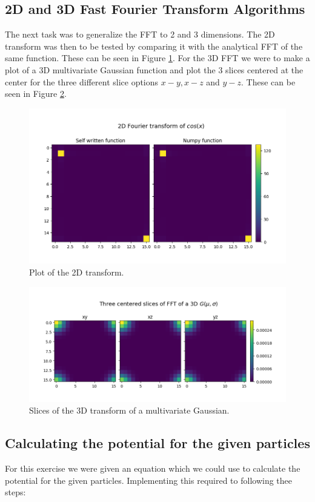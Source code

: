\documentclass[a4paper,10pt]{article}
\begin{document}
\subsection{2D and 3D Fast Fourier Transform Algorithms}

The next task was to generalize the FFT to 2 and 3 dimensions. The 2D transform was then to be tested by comparing it with the analytical FFT of the same function. These can be seen in Figure \ref{fig:5f}. For the 3D FFT we were to make a plot of a 3D multivariate Gaussian function and plot the 3 slices centered at the center for the three different slice options $x-y, x-z$ and $y-z$. These can be seen in Figure \ref{fig:5g}.

\begin{figure}[h!]
  \centering
  \includegraphics[width=0.7\linewidth]{./plots/5f.png}
  \caption{Plot of the 2D transform.}
  \label{fig:5f}
\end{figure}

\begin{figure}[h!]
  \centering
  \includegraphics[width=0.7\linewidth]{./plots/5g.png}
  \caption{Slices of the 3D transform of a multivariate Gaussian.}
  \label{fig:5g}
\end{figure}

\subsection{Calculating the potential for the given particles}

For this exercise we were given an equation which we could use to calculate the potential for the given particles. Implementing this required to following thee steps: 
\end{document}
